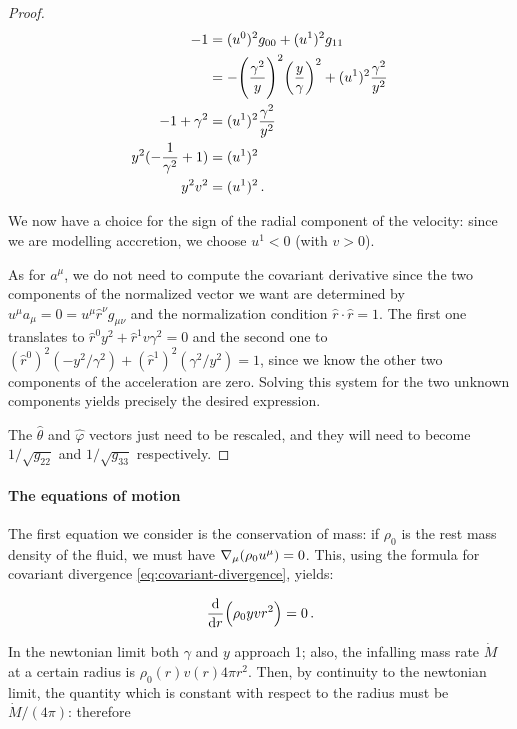 \documentclass[main.tex]{subfiles}
\begin{document}
\begin{proof}
    \begin{subequations}
    \begin{align}
      -1 &= (u^0)^2 g_{00} + (u^1)^2 g_{11} \\
      &= -\qty(\frac{\gamma^2}{y})^2 \qty(\frac{y}{\gamma} )^2 + (u^1)^2 \frac{\gamma^2}{y^2} \\
      -1 + \gamma^2 &= (u^1)^2 \frac{\gamma^2}{y^2} \\
      y^2 (-\frac{1}{\gamma^2}  + 1) &= (u^1)^2 \\
      y^2 v^2 &= (u^1)^2 \,.
    \end{align}
    \end{subequations}

    We now have a choice for the sign of the radial component of the velocity: since we are modelling acccretion, we choose \(u^1 < 0\) (with \(v>0\)).

    As for \(a^\mu\), we do not need to compute the covariant derivative since the two components of the normalized vector we want are determined by \(u^\mu a_\mu = 0= u^\mu \hat{r}^\nu g_{\mu\nu}\) and the normalization condition \(\hat{r} \cdot \hat{r} = 1\). The first one translates to \(\hat{r}^0 y^2 + \hat{r} ^1 v \gamma^2 = 0\) and the second one to \((\hat{r}^0)^2 (- y^2 / \gamma^2) + (\hat{r}^1)^2 (\gamma^2 / y^2) = 1\), since we know the other two components of the acceleration are zero.
    Solving this system for the two unknown components yields precisely the desired expression.

    The \(\hat{\theta}\) and \(\hat{\varphi}\) vectors just need to be rescaled, and they will need to become \(1 / \sqrt{g_{22}}\) and \(1/\sqrt{g_{33}}\) respectively.
\end{proof}

\paragraph{The equations of motion}

The first equation we consider is the conservation of mass: if $\rho_0$ is the rest mass density of the fluid, we must have $\nabla_\mu \qty(\rho_0 u^\mu) =0$. This, using the formula for covariant divergence \eqref{eq:covariant-divergence}, yields:

\begin{equation} \label{eq:integral-continuity}
    \dv{}{r} \qty(\rho_0 yvr^2) = 0 \,.
\end{equation}

In the newtonian limit both $\gamma$ and $y$ approach 1; also, the infalling mass rate $\Dot{M}$ at a certain radius is $\rho_0 (r) v(r) 4\pi r^2$. Then, by continuity to the newtonian limit, the quantity which is constant with respect to the radius must be $\Dot{M} / (4\pi)$: therefore
\end{document}
